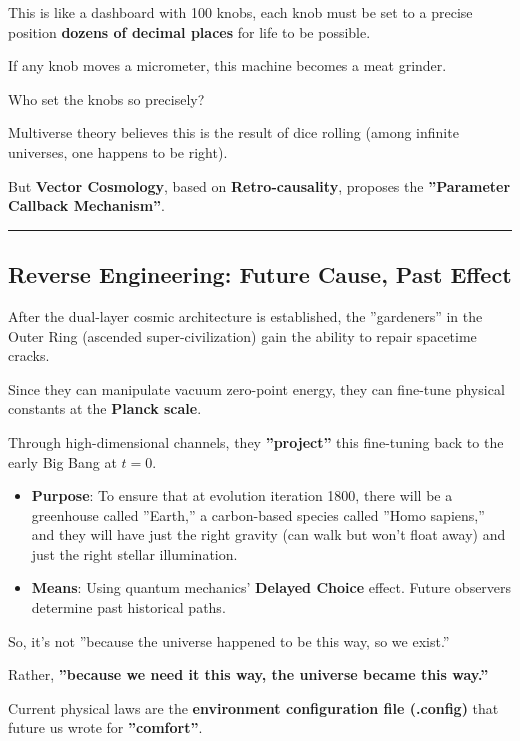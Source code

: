 This is like a dashboard with 100 knobs, each knob must be set to a precise position \textbf{dozens of decimal places} for life to be possible.

If any knob moves a micrometer, this machine becomes a meat grinder.

Who set the knobs so precisely?

Multiverse theory believes this is the result of dice rolling (among infinite universes, one happens to be right).

But \textbf{Vector Cosmology}, based on \textbf{Retro-causality}, proposes the \textbf{''Parameter Callback Mechanism''}.

\hrule

\subsection{Reverse Engineering: Future Cause, Past Effect}

After the dual-layer cosmic architecture is established, the ''gardeners'' in the Outer Ring (ascended super-civilization) gain the ability to repair spacetime cracks.

Since they can manipulate vacuum zero-point energy, they can fine-tune physical constants at the \textbf{Planck scale}.

Through high-dimensional channels, they \textbf{''project''} this fine-tuning back to the early Big Bang at $t=0$.

\begin{itemize}
\item \textbf{Purpose}: To ensure that at evolution iteration 1800, there will be a greenhouse called ''Earth,'' a carbon-based species called ''Homo sapiens,'' and they will have just the right gravity (can walk but won't float away) and just the right stellar illumination.

\item \textbf{Means}: Using quantum mechanics' \textbf{Delayed Choice} effect. Future observers determine past historical paths.
\end{itemize}

So, it's not ''because the universe happened to be this way, so we exist.''

Rather, \textbf{''because we need it this way, the universe became this way.''}

Current physical laws are the \textbf{environment configuration file (.config)} that future us wrote for \textbf{''comfort''}.

